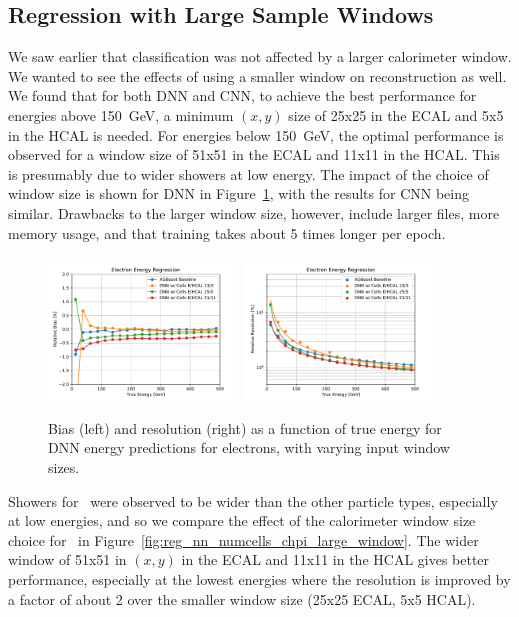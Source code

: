 \subsection*{Regression with Large Sample Windows}

We saw earlier that classification was not affected by a larger calorimeter window. We wanted to see the effects of using a smaller window on reconstruction as well. We found that for both DNN and CNN, to achieve the best performance for energies above 150~GeV, a minimum $(x,y)$ size of 25x25 in the ECAL and 5x5 in the HCAL is needed. For energies below 150~GeV, the optimal performance is observed for a window size of 51x51 in the ECAL and 11x11 in the HCAL. This is presumably due to wider showers at low energy.  The impact of the choice of window size is shown for DNN in Figure~\ref{fig:reg_dnn_numcells}, with the results for CNN being similar.  Drawbacks to the larger window size, however, include larger files, more memory usage, and that training takes about 5 times longer per epoch.

\begin{figure}[htbp]
\centering
\includegraphics[width=0.45\textwidth]{Images/Calo/bias_vs_E_EleFixed_nn_numcells_zoom.pdf}
\includegraphics[width=0.45\textwidth]{Images/Calo/res_vs_E_EleFixed_nn_numcells_fits.pdf}
\caption{Bias (left) and resolution (right) as a function of true energy for DNN energy predictions for electrons, with varying input window sizes.
}
\label{fig:reg_dnn_numcells}
\end{figure}

Showers for \chpi\ were observed to be wider than the other particle types, especially at low energies, and so we compare the effect of the calorimeter window size choice for \chpi\ in Figure~\ref{fig:reg_nn_numcells_chpi_large_window}. The wider window of 51x51 in $(x,y)$ in the ECAL and 11x11 in the HCAL gives better performance, especially at the lowest energies where the resolution is improved by a factor of about 2 over the smaller window size (25x25 ECAL, 5x5 HCAL).

